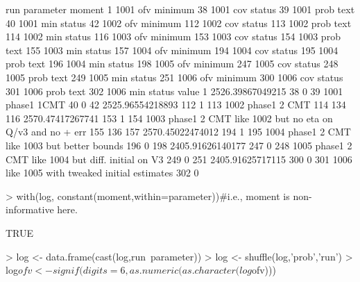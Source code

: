 \begin{Schunk}
\begin{Soutput}
     run parameter  moment
1   1001       ofv minimum
38  1001       cov  status
39  1001      prob    text
40  1001       min  status
42  1002       ofv minimum
112 1002       cov  status
113 1002      prob    text
114 1002       min  status
116 1003       ofv minimum
153 1003       cov  status
154 1003      prob    text
155 1003       min  status
157 1004       ofv minimum
194 1004       cov  status
195 1004      prob    text
196 1004       min  status
198 1005       ofv minimum
247 1005       cov  status
248 1005      prob    text
249 1005       min  status
251 1006       ofv minimum
300 1006       cov  status
301 1006      prob    text
302 1006       min  status
                                                          value
1                                              2526.39867049215
38                                                            0
39                                             1001 phase1 1CMT
40                                                            0
42                                             2525.96554218893
112                                                           1
113                                           1002 phase1 2 CMT
114                                                         134
116                                            2570.47417267741
153                                                           1
154 1003 phase1 2 CMT like 1002 but no eta on Q/v3 and no + err
155                                                         136
157                                            2570.45022474012
194                                                           1
195               1004 phase1 2 CMT like 1003 but better bounds
196                                                           0
198                                            2405.91626140177
247                                                           0
248         1005 phase1 2 CMT like 1004 but diff. initial on V3
249                                                           0
251                                            2405.91625717115
300                                                           0
301               1006 like 1005 with tweaked initial estimates
302                                                           0
\end{Soutput}
\begin{Sinput}
> with(log, constant(moment,within=parameter))#i.e., moment is non-informative here.
\end{Sinput}
\begin{Soutput}
[1] TRUE
\end{Soutput}
\begin{Sinput}
> log <- data.frame(cast(log,run~parameter))
> log <- shuffle(log,'prob','run')
> log$ofv <- signif(digits=6,as.numeric(as.character(log$ofv)))
\end{Sinput}
\end{Schunk}

